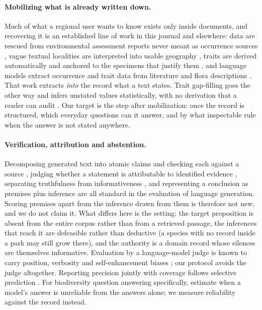 \documentclass[11pt,a4paper]{article}
\begin{document}
\paragraph{Mobilizing what is already written down.} Much of what a regional user
wants to know exists only inside documents, and recovering it is an established line
of work in this journal and elsewhere: data are rescued from environmental assessment
reports never meant as occurrence sources \citep{telletxea2026stray}, vague textual
localities are interpreted into usable geography \citep{campbell2024near}, traits are
derived automatically and anchored to the specimens that justify them
\citep{bakis2026raunkiaeran}, and language models extract occurrence and trait data
from literature and flora descriptions \citep{castro2024llm,bamba2025flora,arete2025}.
That work extracts \emph{into} the record what a text states. Trait gap-filling goes
the other way and infers unstated values statistically, with no derivation that a
reader can audit \citep{schrodt2015bhpmf}. Our target is the step after
mobilization: once the record is structured, which everyday questions can it answer,
and by what inspectable rule when the answer is not stated anywhere.

\paragraph{Verification, attribution and abstention.} Decomposing generated text into
atomic claims and checking each against a source \citep{min2023factscore}, judging
whether a statement is attributable to identified evidence \citep{rashkin2023ais},
separating truthfulness from informativeness \citep{lin2022truthfulqa,
prasad2023receval}, and representing a conclusion as premises plus inference
\citep{dalvi2021entailment} are all standard in the evaluation of language
generation. Scoring premises apart from the inference drawn from them is therefore
not new, and we do not claim it. What differs here is the setting: the target
proposition is absent from the entire corpus rather than from a retrieved passage,
the inferences that reach it are defeasible rather than deductive (a species with no
record inside a park may still grow there), and the authority is a domain record
whose silences are themselves informative. Evaluation by a language-model judge is
known to carry position, verbosity and self-enhancement biases
\citep{zheng2023judge}; our protocol avoids the judge altogether. Reporting precision
jointly with coverage follows selective prediction \citep{elyaniv2010selective,
kamath2020selective}. For biodiversity question answering specifically,
\citet{moracross2024uq} estimate when a model's answer is unreliable from the
answers alone; we measure reliability against the record instead.
\end{document}
